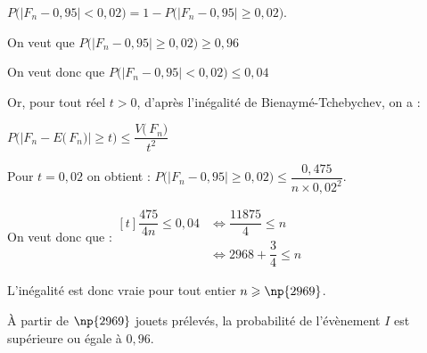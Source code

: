 \begin{enumerate}
\begin{enumerate}
$P\Big(\big|F_n - 0,95 \big| < 0,02\Big) = 1 - P\Big(\big|F_{n} - 0,95 \big| \geqslant 0,02\Big)$.

On veut que $P\Big(\big|F_{n} - 0,95 \big| \geqslant 0,02\Big) \geqslant 0,96$

On veut donc que $P\Big(\big|F_n - 0,95 \big| < 0,02\Big) \leqslant 0,04$

Or, pour tout réel $t > 0$, d'après l'inégalité de Bienaymé-Tchebychev, on a :

$P\Big(\big|F_n-E\big(\,F_n\big)\big| \geqslant t\Big) \leqslant \dfrac{V\big(\,F_n\big)}{t^2}$

Pour $t = 0,02$ on obtient : $ P\Big(\big|F_n-0,95\big| \geqslant 0,02\Big)\leqslant \dfrac{0,475}{ n \times 0,02^2}$.

On veut donc que :\quad $\begin{aligned}[t]
		\dfrac{475}{4 n} \leqslant 0,04 &\iff
		\dfrac{11875}{4} \leqslant n \\
		&\iff 2968+\dfrac{3}{4}\leqslant n
	\end{aligned}$

L'inégalité est donc vraie pour tout entier $n \geqslant \np{2969}$.

À partir de $\np{2969}$ jouets prélevés, la probabilité de l'évènement $I$ est supérieure ou égale à $0,96$.
	\end{enumerate}
\end{enumerate}

\medskip

